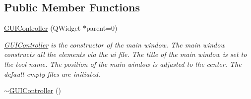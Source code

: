\subsection*{Public Member Functions}
\begin{DoxyCompactItemize}
\item 
\hyperlink{classGUIController_a3f85fdeac642a3c52c0f0b586462eb8a}{G\-U\-I\-Controller} (Q\-Widget $\ast$parent=0)
\begin{DoxyCompactList}\small\item\em \hyperlink{classGUIController}{G\-U\-I\-Controller} is the constructor of the main window. The main window constructs all the elements via the ui file. The title of the main window is set to the tool name. The position of the main window is adjusted to the center. The default empty files are initiated. \end{DoxyCompactList}\item 
\hypertarget{classGUIController_acf3b4a6d7ab7be45f20ab41831644444}{\hyperlink{classGUIController_acf3b4a6d7ab7be45f20ab41831644444}{$\sim$\-G\-U\-I\-Controller} ()}\label{classGUIController_acf3b4a6d7ab7be45f20ab41831644444}


\end{DoxyCompactItemize}

